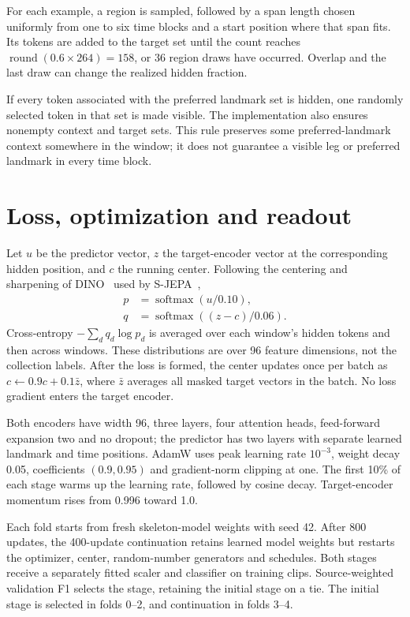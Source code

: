 \documentclass[10pt,twocolumn,letterpaper]{article}
\begin{document}
For each example, a region is sampled, followed by a span length chosen uniformly from one to six time blocks and a start position where that span fits. Its tokens are added to the target set until the count reaches $\operatorname{round}(0.6\times264)=158$, or 36 region draws have occurred. Overlap and the last draw can change the realized hidden fraction.

If every token associated with the preferred landmark set is hidden, one randomly selected token in that set is made visible. The implementation also ensures nonempty context and target sets. This rule preserves some preferred-landmark context somewhere in the window; it does not guarantee a visible leg or preferred landmark in every time block.

\section{Loss, optimization and readout}
Let $u$ be the predictor vector, $z$ the target-encoder vector at the corresponding hidden position, and $c$ the running center. Following the centering and sharpening of DINO~\cite{dino} used by S-JEPA~\cite{sjepa},
\begin{equation}
\begin{aligned}
p &= \operatorname{softmax}(u/0.10),\\
q &= \operatorname{softmax}((z-c)/0.06).
\end{aligned}
\end{equation}
Cross-entropy $-\sum_d q_d\log p_d$ is averaged over each window's hidden tokens and then across windows. These distributions are over 96 feature dimensions, not the collection labels. After the loss is formed, the center updates once per batch as $c\leftarrow0.9c+0.1\bar z$, where $\bar z$ averages all masked target vectors in the batch. No loss gradient enters the target encoder.

Both encoders have width 96, three layers, four attention heads, feed-forward expansion two and no dropout; the predictor has two layers with separate learned landmark and time positions. AdamW uses peak learning rate $10^{-3}$, weight decay 0.05, coefficients $(0.9,0.95)$ and gradient-norm clipping at one. The first 10\% of each stage warms up the learning rate, followed by cosine decay. Target-encoder momentum rises from 0.996 toward 1.0.

Each fold starts from fresh skeleton-model weights with seed 42. After 800 updates, the 400-update continuation retains learned model weights but restarts the optimizer, center, random-number generators and schedules. Both stages receive a separately fitted scaler and classifier on training clips. Source-weighted validation F1 selects the stage, retaining the initial stage on a tie. The initial stage is selected in folds 0--2, and continuation in folds 3--4.
\end{document}
